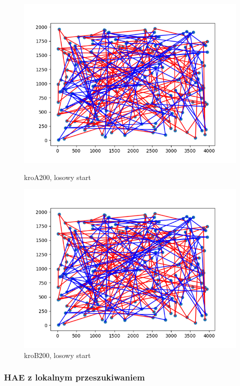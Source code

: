 \documentclass[11pt]{article}
\begin{document}
\begin{figure}[H]
    \begin{minipage}[t]{0.45\textwidth}
        \centering
        \includegraphics[width=\linewidth]{best_paths/kroA200/HAE}
        \caption{kroA200, losowy start}
    \end{minipage}
    \hfill
    \begin{minipage}[t]{0.45\textwidth}
        \centering
        \includegraphics[width=\linewidth]{best_paths/kroB200/HAE}
        \caption{kroB200, losowy start}
    \end{minipage}\label{fig:figure6}
\end{figure}

\subsubsection{HAE z lokalnym przeszukiwaniem}
\end{document}
